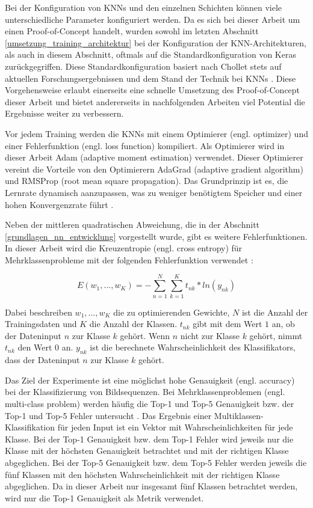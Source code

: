 Bei der Konfiguration von \acp{KNN} und den einzelnen Schichten können viele unterschiedliche Parameter konfiguriert werden. Da es sich bei dieser Arbeit um einen Proof-of-Concept handelt, wurden sowohl im letzten Abschnitt \ref{umsetzung_training_architektur} bei der Konfiguration der \ac{KNN}-Architekturen, als auch in diesem Abschnitt, oftmals auf die Standardkonfiguration von Keras zurückgegriffen. Diese Standardkonfiguration basiert nach Chollet stets auf aktuellen Forschungsergebnissen und dem Stand der Technik bei \acp{KNN} \cite{chollet2015keras}. Diese Vorgehensweise erlaubt einerseits eine schnelle Umsetzung des Proof-of-Concept dieser Arbeit und bietet andererseits in nachfolgenden Arbeiten viel Potential die Ergebnisse weiter zu verbessern.

Vor jedem Training werden die \acp{KNN} mit einem Optimierer (engl. optimizer) und einer Fehlerfunktion (engl. loss function) kompiliert. Als Optimierer wird in dieser Arbeit Adam (adaptive moment estimation) verwendet. Dieser Optimierer vereint die Vorteile von den Optimierern AdaGrad (adaptive gradient algorithm) und RMSProp (root mean square propagation). Das Grundprinzip ist es, die Lernrate dynamisch aanzupassen, was zu weniger benötigtem Speicher und einer hohen Konvergenzrate führt \cite{kingma2014adam}.

 Neben der mittleren quadratischen Abweichung, die in der Abschnitt \ref{grundlagen_nn_entwicklung} vorgestellt wurde, gibt es weitere Fehlerfunktionen. In dieser Arbeit wird die Kreuzentropie (engl. cross entropy) für Mehrklassenprobleme mit der folgenden Fehlerfunktion verwendet \cite{bishop2006pattern}:

\begin{equation}
E(w_1, ..., w_K) = -\sum _{n=1}^N \sum _{k=1}^K t_{nk} * ln(y_{nk})
\end{equation}

Dabei beschreiben $w_1, ..., w_K$ die zu optimierenden Gewichte, $N$ ist die Anzahl der Trainingsdaten und $K$ die Anzahl der Klassen. $t_{nk}$ gibt mit dem Wert $1$ an, ob der Dateninput $n$ zur Klasse $k$ gehört. Wenn $n$ nicht zur Klasse $k$ gehört, nimmt $t_{nk}$ den Wert $0$ an. $y_{nk}$ ist die berechnete Wahrscheinlichkeit des Klassifikators, dass der Dateninput $n$ zur Klasse $k$ gehört.

Das Ziel der Experimente ist eine möglichst hohe Genauigkeit (engl. accuracy) bei der Klassifizierung von Bildsequenzen. Bei Mehrklassenproblemen (engl. multi-class problem) werden häufig die Top-1 und Top-5 Genauigkeit bzw. der Top-1 und Top-5 Fehler untersucht \cite{szegedy2016inception, simonyan2014vgg}. Das Ergebnis einer Multiklassen-Klassifikation für jeden Input ist ein Vektor mit Wahrscheinlichkeiten für jede Klasse. Bei der Top-1 Genauigkeit bzw. dem Top-1 Fehler wird jeweils nur die Klasse mit der höchsten Genauigkeit betrachtet und mit der richtigen Klasse abgeglichen. Bei der Top-5 Genauigkeit bzw. dem Top-5 Fehler werden jeweils die fünf Klassen mit den höchsten Wahrscheinlichkeit mit der richtigen Klasse abgeglichen. Da in dieser Arbeit nur insgesamt fünf Klassen betrachtet werden, wird nur die Top-1 Genauigkeit als Metrik verwendet.

